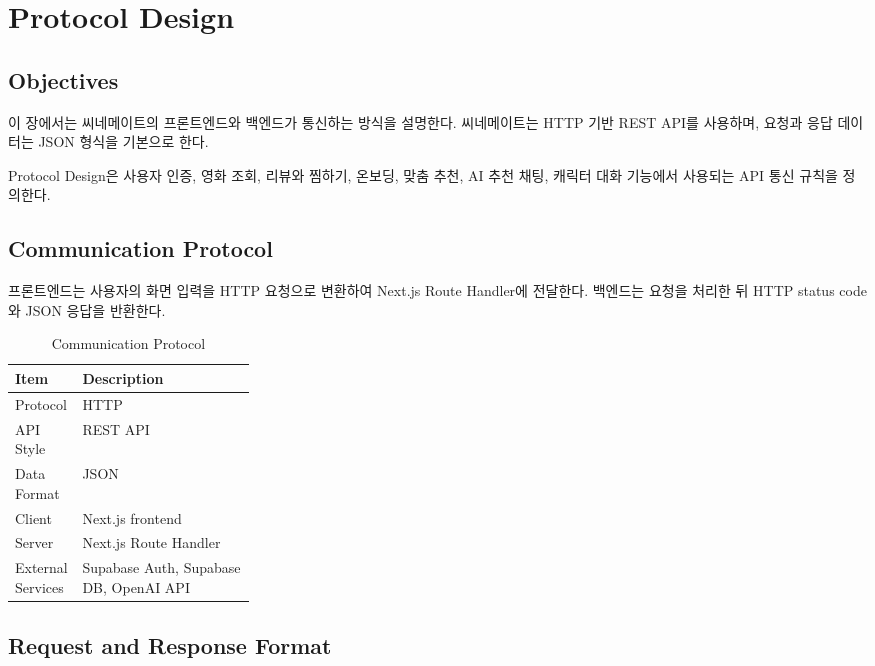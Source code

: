 \documentclass[11pt,a4paper]{article}
\renewcommand{\arraystretch}{1.18}
\begin{document}
\hypertarget{protocol-design}{%
\section{Protocol Design}\label{protocol-design}}

\hypertarget{objectives-4}{%
\subsection{Objectives}\label{objectives-4}}

이 장에서는 씨네메이트의 프론트엔드와 백엔드가 통신하는 방식을 설명한다. 씨네메이트는 HTTP 기반 REST API를 사용하며, 요청과 응답 데이터는 JSON 형식을 기본으로 한다.

Protocol Design은 사용자 인증, 영화 조회, 리뷰와 찜하기, 온보딩, 맞춤 추천, AI 추천 채팅, 캐릭터 대화 기능에서 사용되는 API 통신 규칙을 정의한다.

\hypertarget{communication-protocol}{%
\subsection{Communication Protocol}\label{communication-protocol}}

프론트엔드는 사용자의 화면 입력을 HTTP 요청으로 변환하여 Next.js Route Handler에 전달한다. 백엔드는 요청을 처리한 뒤 HTTP status code와 JSON 응답을 반환한다.

\begin{table}[H]
\centering
\small
\setlength{\tabcolsep}{5pt}
\renewcommand{\arraystretch}{1.28}
\begin{tabularx}{\linewidth}{@{}>{\RaggedRight\arraybackslash}p{0.28\linewidth}>{\RaggedRight\arraybackslash}X@{}}
\toprule
\textbf{Item} & \textbf{Description} \\
\midrule
Protocol & HTTP \\
API Style & REST API \\
Data Format & JSON \\
Client & Next.js frontend \\
Server & Next.js Route Handler \\
External Services & Supabase Auth, Supabase DB, OpenAI API \\
\bottomrule
\end{tabularx}
\caption{Communication Protocol}
\end{table}

\hypertarget{request-and-response-format}{%
\subsection{Request and Response Format}\label{request-and-response-format}}
\end{document}
